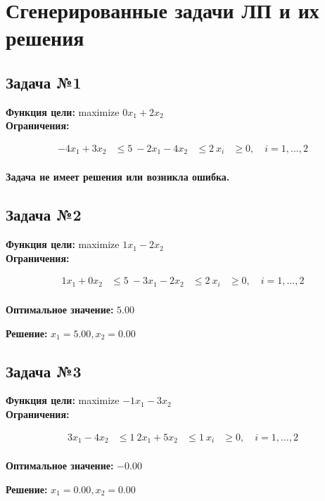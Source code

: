 \documentclass[a4paper,12pt]{article}
\begin{document}
\section*{Сгенерированные задачи ЛП и их решения}

\subsection*{Задача №1}
\textbf{Функция цели: }
maximize $ 0x_{1} +2x_{2} $\\

\textbf{Ограничения:}

\[ \begin{aligned}
-4x_{1} +3x_{2} &\le 5 \
-2x_{1} -4x_{2} &\le 2 \
x_i &\ge 0, \quad i=1,\dots,2 \\
\end{aligned}\]

\textbf{Задача не имеет решения или возникла ошибка.}



\subsection*{Задача №2}
\textbf{Функция цели: }
maximize $ 1x_{1} -2x_{2} $\\

\textbf{Ограничения:}

\[ \begin{aligned}
1x_{1} +0x_{2} &\le 5 \
-3x_{1} -2x_{2} &\le 2 \
x_i &\ge 0, \quad i=1,\dots,2 \\
\end{aligned}\]

\textbf{Оптимальное значение: }$5.00$

\textbf{Решение: }$x_{1}=5.00, x_{2}=0.00$



\subsection*{Задача №3}
\textbf{Функция цели: }
maximize $ -1x_{1} -3x_{2} $\\

\textbf{Ограничения:}

\[ \begin{aligned}
3x_{1} -4x_{2} &\le 1 \
2x_{1} +5x_{2} &\le 1 \
x_i &\ge 0, \quad i=1,\dots,2 \\
\end{aligned}\]

\textbf{Оптимальное значение: }$-0.00$

\textbf{Решение: }$x_{1}=0.00, x_{2}=0.00$
\end{document}
